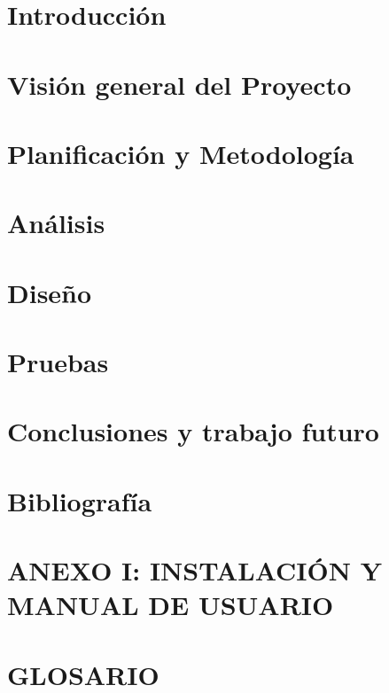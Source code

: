 \documentclass[b5paper,10pt,twoside]{book}
\begin{document}
	\tableofcontents
	
	\listoffigures
	
	\listoftables
	

	\chapter{Introducción}
	
	
	
	\chapter{Visión general del Proyecto}

	
	
	\chapter{Planificación y Metodología}
	
	
	
	\chapter{Análisis}
	
	
	
	\chapter{Diseño}
	
	
	
	\chapter{Pruebas}
	
	
	
	\chapter{Conclusiones y trabajo futuro}
	
	
	
	\chapter{Bibliografía}
	
	
	
	\chapter*{ANEXO I: INSTALACIÓN Y MANUAL DE USUARIO }
		
	
	
	\chapter*{GLOSARIO}
	
	
\end{document}
